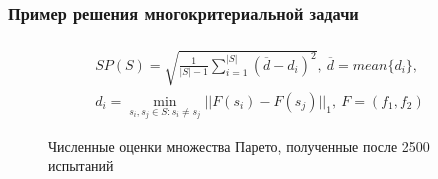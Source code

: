 \documentclass[aspectratio=1610]{beamer}
\begin{document}
\begin{frame}
  \frametitle{Пример решения многокритериальной задачи}
  \vspace*{-1.0cm}
  \begin{displaymath}
    \begin{array}{cr}\\
      SP(S)=\sqrt{\frac{1}{|S|-1} \sum_{i=1}^{|S|} (\overline{d}-d_i)^2},\:\overline{d}=mean\{d_i\}, \\
      d_i=\min_{s_i,s_j\in S:s_i\ne s_j}||F(s_i)-F(s_j)||_1,\: F=(f_1,f_2)
    \end{array}
  \end{displaymath}

  \begin{figure}[ht]
      \centering
      \vspace*{-0.5cm}
      \caption{Численные оценки множества Парето, полученные после 2500 испытаний}
      \label{fig:mco_pareto}
  \end{figure}
\end{frame}
\end{document}
